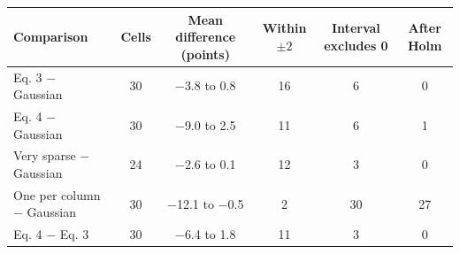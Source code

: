 \begin{tabular}{@{}lccccc@{}}
\toprule
Comparison & Cells & Mean difference (points) & Within $\pm 2$ & Interval excludes 0 & After Holm \\
\midrule
Eq. 3 $-$ Gaussian & 30 & $-$3.8 to 0.8 & 16 & 6 & 0 \\
Eq. 4 $-$ Gaussian & 30 & $-$9.0 to 2.5 & 11 & 6 & 1 \\
Very sparse $-$ Gaussian & 24 & $-$2.6 to 0.1 & 12 & 3 & 0 \\
One per column $-$ Gaussian & 30 & $-$12.1 to $-$0.5 & 2 & 30 & 27 \\
Eq. 4 $-$ Eq. 3 & 30 & $-$6.4 to 1.8 & 11 & 3 & 0 \\
\bottomrule
\end{tabular}
